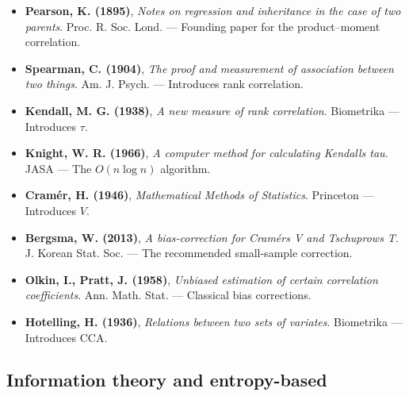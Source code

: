\documentclass{article}
\providecommand{\tightlist}{\setlength{\itemsep}{0pt}\setlength{\parskip}{0pt}}
\begin{document}
\begin{itemize}
\tightlist
\item
  \textbf{Pearson, K. (1895)}, \emph{Notes on regression and inheritance
  in the case of two parents}. Proc. R. Soc. Lond. --- Founding paper
  for the product--moment correlation.
\item
  \textbf{Spearman, C. (1904)}, \emph{The proof and measurement of
  association between two things}. Am. J. Psych. --- Introduces rank
  correlation.
\item
  \textbf{Kendall, M. G. (1938)}, \emph{A new measure of rank
  correlation}. Biometrika --- Introduces \(\tau\).
\item
  \textbf{Knight, W. R. (1966)}, \emph{A computer method for calculating
  Kendall\textquotesingle s tau}. JASA --- The \(O(n \log n)\)
  algorithm.
\item
  \textbf{Cramér, H. (1946)}, \emph{Mathematical Methods of Statistics}.
  Princeton --- Introduces \(V\).
\item
  \textbf{Bergsma, W. (2013)}, \emph{A bias-correction for
  Cramér\textquotesingle s V and Tschuprow\textquotesingle s T}. J.
  Korean Stat. Soc. --- The recommended small-sample correction.
\item
  \textbf{Olkin, I., Pratt, J. (1958)}, \emph{Unbiased estimation of
  certain correlation coefficients}. Ann. Math. Stat. --- Classical bias
  corrections.
\item
  \textbf{Hotelling, H. (1936)}, \emph{Relations between two sets of
  variates}. Biometrika --- Introduces CCA.
\end{itemize}

\subsection{Information theory and
entropy-based}\label{information-theory-and-entropy-based}
\end{document}
